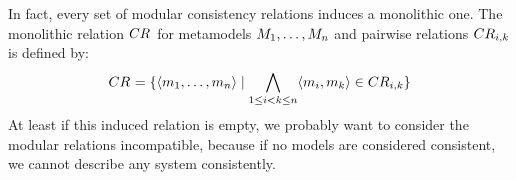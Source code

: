 In fact, every set of modular consistency relations induces a monolithic one.
The monolithic relation $\consistencyrelation{CR}{}$ for metamodels $\metamodelsequence{M}{n}$ and pairwise relations $\consistencyrelation{CR}{i,k}$ is defined by:
\begin{align*}
    \consistencyrelation{CR}{} = \setted{\tupled{\model{m}{1}, \dots, \model{m}{n}} \mid \bigwedge\limits_{1 \le i < k \le n} \tupled{\model{m}{i}, \model{m}{k}} \in \consistencyrelation{CR}{i,k}}
\end{align*}
At least if this induced relation is empty, we probably want to consider the modular relations incompatible, because if no models are considered consistent, we cannot describe any system consistently.

